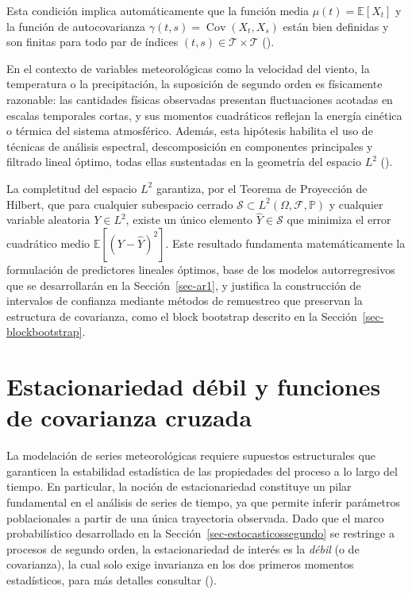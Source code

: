 \documentclass[
  spanish,
  us-letterpaper,
]{scrreprt}
\numberwithin{equation}{section}
\begin{document}
Esta condición implica automáticamente que la función media
\(\mu(t) = \mathbb{E}[X_t]\) y la función de autocovarianza
\(\gamma(t,s) = \operatorname{Cov}(X_t, X_s)\) están bien definidas y
son finitas para todo par de índices
\((t,s) \in \mathcal{T} \times \mathcal{T}\)
().

En el contexto de variables meteorológicas como la velocidad del viento,
la temperatura o la precipitación, la suposición de segundo orden es
físicamente razonable: las cantidades físicas observadas presentan
fluctuaciones acotadas en escalas temporales cortas, y sus momentos
cuadráticos reflejan la energía cinética o térmica del sistema
atmosférico. Además, esta hipótesis habilita el uso de técnicas de
análisis espectral, descomposición en componentes principales y filtrado
lineal óptimo, todas ellas sustentadas en la geometría del espacio
\(L^2\) ().

La completitud del espacio \(L^2\) garantiza, por el Teorema de
Proyección de Hilbert, que para cualquier subespacio cerrado
\(\mathcal{S} \subset L^2(\Omega, \mathcal{F}, \mathbb{P})\) y cualquier
variable aleatoria \(Y \in L^2\), existe un único elemento
\(\hat{Y} \in \mathcal{S}\) que minimiza el error cuadrático medio
\(\mathbb{E}[(Y - \hat{Y})^2]\). Este resultado fundamenta
matemáticamente la formulación de predictores lineales óptimos, base de
los modelos autorregresivos que se desarrollarán en la
Sección~\ref{sec-ar1}, y justifica la construcción de intervalos de
confianza mediante métodos de remuestreo que preservan la estructura de
covarianza, como el block bootstrap descrito en la
Sección~\ref{sec-blockbootstrap}.

\section{Estacionariedad débil y funciones de covarianza
cruzada}\label{estacionariedad-duxe9bil-y-funciones-de-covarianza-cruzada}

La modelación de series meteorológicas requiere supuestos estructurales
que garanticen la estabilidad estadística de las propiedades del proceso
a lo largo del tiempo. En particular, la noción de estacionariedad
constituye un pilar fundamental en el análisis de series de tiempo, ya
que permite inferir parámetros poblacionales a partir de una única
trayectoria observada. Dado que el marco probabilístico desarrollado en
la Sección~\ref{sec-estocasticossegundo} se restringe a procesos de
segundo orden, la estacionariedad de interés es la \emph{débil} (o de
covarianza), la cual solo exige invarianza en los dos primeros momentos
estadísticos, para más detalles consultar
().
\end{document}
